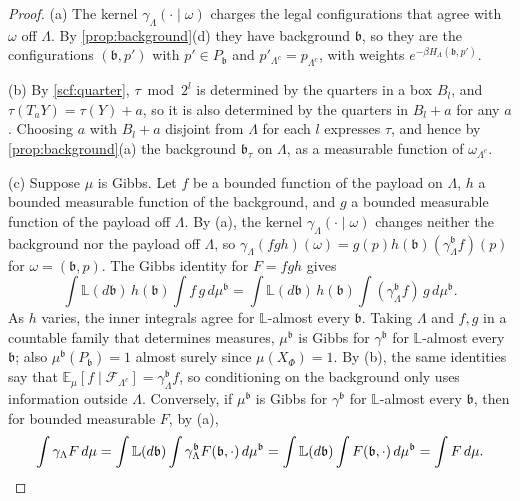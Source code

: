 \begin{proof}
(a) The kernel $\gamma_\Lambda(\cdot\mid\omega)$ charges the legal configurations that agree with $\omega$ off $\Lambda$. By \cref{prop:background}(d) they have background $\mathfrak b$, so they are the configurations $(\mathfrak b,p')$ with $p'\in P_{\mathfrak b}$ and $p'_{\Lambda^c}=p_{\Lambda^c}$, with weights $e^{-\beta H_\Lambda(\mathfrak b,p')}$.

(b) By \cref{scf:quarter}, $\tau\bmod2^l$ is determined by the quarters in a box $B_l$, and $\tau(T_aY)=\tau(Y)+a$, so it is also determined by the quarters in $B_l+a$ for any $a$. Choosing $a$ with $B_l+a$ disjoint from $\Lambda$ for each $l$ expresses $\tau$, and hence by \cref{prop:background}(a) the background $\mathfrak b_\tau$ on $\Lambda$, as a measurable function of $\omega_{\Lambda^c}$.

(c) Suppose $\mu$ is Gibbs. Let $f$ be a bounded function of the payload on $\Lambda$, $h$ a bounded measurable function of the background, and $g$ a bounded measurable function of the payload off $\Lambda$. By (a), the kernel $\gamma_\Lambda(\cdot\mid\omega)$ changes neither the background nor the payload off $\Lambda$, so $\gamma_\Lambda(fgh)(\omega)=g(p)h(\mathfrak b)(\gamma^{\mathfrak b}_\Lambda f)(p)$ for $\omega=(\mathfrak b,p)$. The Gibbs identity for $F=fgh$ gives
\[
\int\mathbb L(d\mathfrak b)\,h(\mathfrak b)\int f\,g\,d\mu^{\mathfrak b}=\int\mathbb L(d\mathfrak b)\,h(\mathfrak b)\int(\gamma^{\mathfrak b}_\Lambda f)\,g\,d\mu^{\mathfrak b}.
\]
As $h$ varies, the inner integrals agree for $\mathbb L$-almost every $\mathfrak b$. Taking $\Lambda$ and $f,g$ in a countable family that determines measures, $\mu^{\mathfrak b}$ is Gibbs for $\gamma^{\mathfrak b}$ for $\mathbb L$-almost every $\mathfrak b$; also $\mu^{\mathfrak b}(P_{\mathfrak b})=1$ almost surely since $\mu(X_\Phi)=1$. By (b), the same identities say that $\mathbb E_\mu[f\mid\mathcal F_{\Lambda^c}]=\gamma^{\mathfrak b}_\Lambda f$, so conditioning on the background only uses information outside $\Lambda$. Conversely, if $\mu^{\mathfrak b}$ is Gibbs for $\gamma^{\mathfrak b}$ for $\mathbb L$-almost every $\mathfrak b$, then for bounded measurable $F$, by (a),
\[
\int\gamma_\Lambda F\,d\mu=\int\mathbb L(d\mathfrak b)\int\gamma^{\mathfrak b}_\Lambda F(\mathfrak b,\cdot)\,d\mu^{\mathfrak b}=\int\mathbb L(d\mathfrak b)\int F(\mathfrak b,\cdot)\,d\mu^{\mathfrak b}=\int F\,d\mu .\qedhere
\]
\end{proof}
